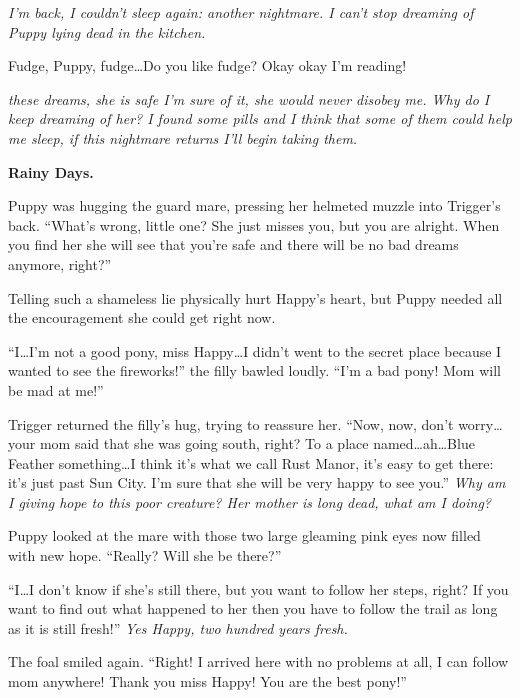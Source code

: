 \emph{I'm back, I couldn't sleep again: another nightmare. I can't stop dreaming of Puppy lying dead in the kitchen.}

\medskip

Fudge, Puppy, fudge\dots Do you like fudge? Okay okay I'm reading!

\medskip

\emph{these dreams, she is safe I'm sure of it, she would never disobey me. Why do I keep dreaming of her? I found some pills and I think that some of them could help me sleep, if this nightmare returns I'll begin taking them.}

\begin{flushright}
    \textbf{Rainy Days.}
\end{flushright}

\medskip

Puppy was hugging the guard mare, pressing her helmeted muzzle into Trigger's back. ``What's wrong, little one? She just misses you, but you are alright. When you find her she will see that you're safe and there will be no bad dreams anymore, right?''

Telling such a shameless lie physically hurt Happy's heart, but Puppy needed all the encouragement she could get right now.

``I\dots I'm not a good pony, miss Happy\dots I didn't went to the secret place because I wanted to see the fireworks!'' the filly bawled loudly. ``I'm a bad pony! Mom will be mad at me!''

Trigger returned the filly's hug, trying to reassure her. ``Now, now, don't worry\dots your mom said that she was going south, right? To a place named\dots ah\dots Blue Feather something\dots I think it's what we call Rust Manor, it's easy to get there: it's just past Sun City. I'm sure that she will be very happy to see you.'' \emph{Why am I giving hope to this poor creature? Her mother is long dead, what am I doing?}

Puppy looked at the mare with those two large gleaming pink eyes now filled with new hope. ``Really? Will she be there?''

``I\dots I don't know if she's still there, but you want to follow her steps, right? If you want to find out what happened to her then you have to follow the trail as long as it is still fresh!'' \emph{Yes Happy, two hundred years fresh.}

The foal smiled again. ``Right! I arrived here with no problems at all, I can follow mom anywhere! Thank you miss Happy! You are the best pony!''


